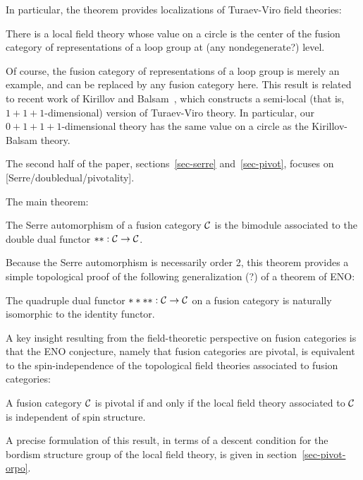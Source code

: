 \documentclass{amsart}
\begin{document}
In particular, the theorem provides localizations of Turaev-Viro field theories:
\begin{corollary}
There is a local field theory whose value on a circle is the center of the fusion category of representations of a loop group at (any nondegenerate?) level.
\end{corollary}
Of course, the fusion category of representations of a loop group is merely an example, and can be replaced by any fusion category here.  This result is related to recent work of Kirillov and Balsam~\cite{kirillovbalsam}, which constructs a semi-local (that is, $1+1+1$-dimensional) version of Turaev-Viro theory.  In particular, our $0+1+1+1$-dimensional theory has the same value on a circle as the Kirillov-Balsam theory.  


The second half of the paper, sections~\ref{sec-serre} and~\ref{sec-pivot}, focuses on [Serre/doubledual/pivotality].

The main theorem:
\begin{theorem}
The Serre automorphism of a fusion category $\mathcal C$ is the bimodule associated to the double dual functor $**: \mathcal C \rightarrow \mathcal C$.
\end{theorem}

Because the Serre automorphism is necessarily order 2, this theorem provides a simple topological proof of the following generalization (?) of a theorem of ENO:
\begin{corollary}
The quadruple dual functor $****: \mathcal C \rightarrow \mathcal C$ on a fusion category is naturally isomorphic to the identity functor.
\end{corollary}

A key insight resulting from the field-theoretic perspective on fusion categories is that the ENO conjecture, namely that fusion categories are pivotal, is equivalent to the spin-independence of the topological field theories associated to fusion categories:
\begin{theorem}
A fusion category $\mathcal C$ is pivotal if and only if the local field theory associated to $\mathcal C$ is independent of spin structure.
\end{theorem}
A precise formulation of this result, in terms of a descent condition for the bordism structure group of the local field theory, is given in section~\ref{sec-pivot-orpo}.
\end{document}
